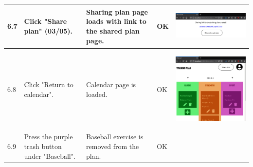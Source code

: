 \documentclass[12pt,twoside,titlepage,a4paper]{article}
\theoremstyle{definicion}
\theoremstyle{lema}
\theoremstyle{teorema}
\theoremstyle{corolario}
\theoremstyle{ejemplo}
\theoremstyle{nota}
\begin{document}
\begin{table}[!h]
\begin{tabular}{|m{0.6cm}|m{2.9cm}|m{3.6cm}|m{1.1cm}|m{5.9cm}|}
		\hline
		6.7 & Click "Share plan" (03/05). & Sharing plan page loads with link to the shared plan page. & OK &
		\begin{center}\includegraphics[scale=0.22]{calendar4-shareplan.png}\end{center} \\
		\hline
		6.8 & Click "Return to calendar". & Calendar page is loaded. & OK &
		\begin{center}\includegraphics[scale=0.22]{calendar1.png}\end{center} \\
		\hline
		6.9 & Press the purple trash button under "Baseball". & Baseball exercise is removed from the plan. & OK &

\end{tabular}
\end{table}
\end{document}

